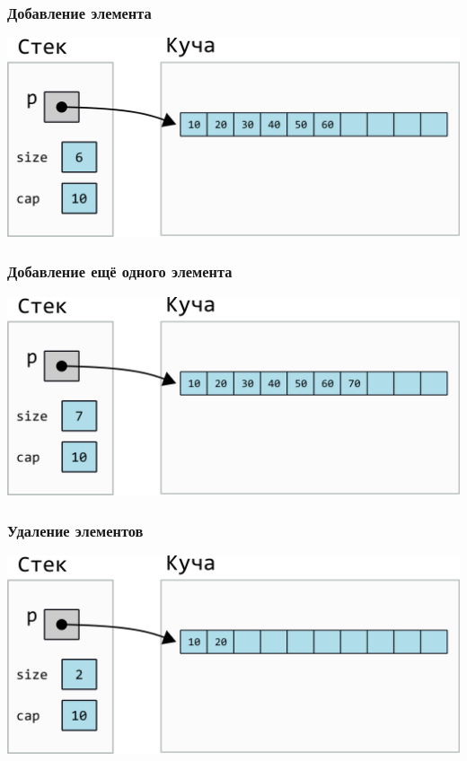 \documentclass[10pt,pdf,hyperref={unicode}]{beamer}
\begin{document}
\begin{frame}[fragile]
\frametitle{Добавление элемента} 
\begin{center}
\includegraphics[scale=0.6]{images/dynamic_array/dynamic_array_cap_add_one3.png}
\end{center}
\end{frame}

\begin{frame}[fragile]
\frametitle{Добавление ещё одного элемента} 
\begin{center}
\includegraphics[scale=0.6]{images/dynamic_array/dynamic_array_cap_add_one4.png}
\end{center}
\end{frame}


\begin{frame}[fragile]
\frametitle{Удаление элементов} 
\begin{center}
\includegraphics[scale=0.6]{images/dynamic_array/dynamic_array_cap_add_one5.png}
\end{center}
\end{frame}
\end{document}
